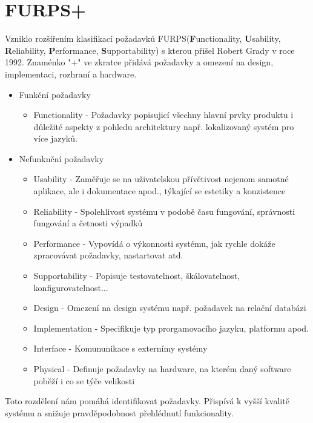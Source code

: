 \section{FURPS+}
	Vzniklo rozšířením klasifikací požadavků FURPS(\textbf{F}unctionality, \textbf{U}sability, \textbf{R}eliability, \textbf{P}erformance, \textbf{S}upportability) s kterou přišel Robert Grady v roce 1992. Znaménko "+" ve zkratce přidává požadavky a omezení na design, implementaci, rozhraní a hardware. 
	
	\begin{itemize}
		\item Funkční požadavky
			\begin{itemize}
				\item Functionality - Požadavky popisujicí všechny hlavní prvky produktu i důležité aspekty z pohledu architektury např. lokalizovaný systém pro více jazyků.
			\end{itemize}
		\item Nefunknční požadavky
			\begin{itemize}
				\item Usability - Zaměřuje se na uživatelskou přívětivost nejenom samotné aplikace, ale i dokumentace apod., týkající se estetiky a konzistence
				\item Reliability - Spolehlivost systému v podobě času fungování, správnosti fungování a četnosti výpadků
				\item Performance - Vypovídá o výkonnosti systému, jak rychle dokáže zpracovávat požadavky, nastartovat atd.
				\item Supportability - Popisuje testovatelnost, škálovatelnost, konfigurovatelnost...
				\item Design - Omezení na design systému např. požadavek na relační databázi
				\item Implementation - Specifikuje typ prorgamovacího jazyku, platformu apod.
				\item Interface - Komununikace s externímy systémy
				\item Physical - Definuje požadavky na hardware, na kterém daný software poběží i co se týče velikosti
			\end{itemize}
	\end{itemize}
	
	Toto rozdělení nám pomáhá identifikovat požadavky. Přispívá k vyšší kvalitě systému a snižuje pravděpodobnost přehlédnutí funkcionality.